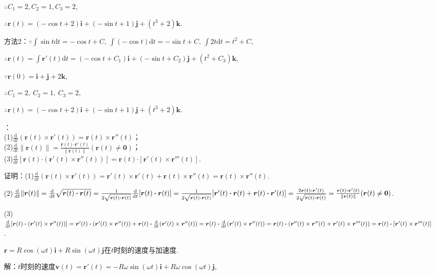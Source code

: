 \documentclass[12pt,UTF8]{ctexart}
\begin{document}
\begin{enumerate}
$\therefore C_1=2,C_2=1,C_3=2$,

$\therefore\bm r(t)=(-\cos t+2)\bm i+(-\sin t+1)\bm j+(t^3+2)\bm k$.

方法2：$\because\int\sin t\mathrm dt=-\cos t+C,\ \int(-\cos t)\mathrm dt=-\sin t+C,\ \int2t\mathrm dt=t^2+C$,

$\therefore\bm r(t)=\int\bm r'(t)\mathrm dt=(-\cos t+C_1)\bm i+(-\sin t+C_2)\bm j+(t^2+C_3)\bm k$,

$\because\bm r(0)=\bm i+\bm j+2\bm k$,

$\therefore C_1=2,\ C_2=1,\ C_3=2$,

$\therefore\bm r(t)=(-\cos t+2)\bm i+(-\sin t+1)\bm j+(t^3+2)\bm k$.

：\\
(1)$\frac{\mathrm d}{\mathrm dt}(\bm r(t)\times\bm r'(t))=\bm r(t)\times\bm r''(t)$；\\
(2)$\frac{\mathrm d}{\mathrm dt}\|\bm r(t)\|=\frac{\bm r(t)\bm\cdot\bm r'(t)}{\|\bm r(t)\|}(\bm r(t)\neq\bm0)$；\\
(3)$\frac{\mathrm d}{\mathrm dt}[\bm r(t)\bm\cdot(\bm r'(t)\times\bm r''(t))]=\bm r(t)\bm\cdot[\bm r'(t)\times\bm r'''(t)]$.

证明：(1)$\frac{\mathrm d}{\mathrm dt}(\bm r(t)\times\bm r'(t))=\bm r'(t)\times\bm r'(t)+\bm r(t)\times\bm r''(t)=\bm r(t)\times\bm r''(t)$.

(2)$\frac{\mathrm d}{\mathrm dt}\|\bm r(t)\|=\frac{\mathrm d}{\mathrm dt}\sqrt{\bm r(t)\bm\cdot\bm r(t)}=\frac1{2\sqrt{\bm r(t)\bm\cdot\bm r(t)}}\frac{\mathrm d}{\mathrm dt}[\bm r(t)\bm\cdot\bm r(t)]\\
=\frac1{2\sqrt{\bm r(t)\bm\cdot\bm r(t)}}[\bm r'(t)\bm\cdot\bm r(t)+\bm r(t)\bm\cdot\bm r'(t)]=\frac{2\bm r(t)\bm\cdot\bm r'(t)}{2\sqrt{\bm r(t)\bm\cdot\bm r(t)}}=\frac{\bm r(t)\bm\cdot\bm r'(t)}{\|\bm r(t)\|}(\bm r(t)\neq\bm0)$.

(3)$\frac{\mathrm d}{\mathrm dt}[\bm r(t)\bm\cdot(\bm r'(t)\times\bm r''(t))]=\bm r'(t)\bm\cdot(\bm r'(t)\times\bm r''(t))+\bm r(t)\bm\cdot\frac{\mathrm d}{\mathrm dt}(\bm r'(t)\times\bm r''(t))\\
=\bm r(t)\bm\cdot\frac{\mathrm d}{\mathrm dt}(\bm r'(t)\times\bm r''(t))=\bm r(t)\bm\cdot(\bm r''(t)\times\bm r''(t)+\bm r'(t)\times\bm r'''(t))=\bm r(t)\bm\cdot[\bm r'(t)\times\bm r'''(t)]$.

$\bm r=R\cos(\omega t)\bm i+R\sin(\omega t)\bm j$在$t$时刻的速度与加速度.

解：$t$时刻的速度$\bm v(t)=\bm r'(t)=-R\omega\sin(\omega t)\bm i+R\omega\cos(\omega t)\bm j$,


\end{enumerate}
\end{document}
